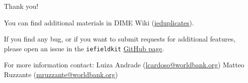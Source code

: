 \documentclass[aspectratio=169]{beamer}
\begin{document}
\begin{frame}{Thank you!}
    
    You can find additional materials in DIME Wiki (\textcolor{blue}{\hyperlink{https://dimewiki.worldbank.org/wiki/Ieduplicates}{ieduplicates}}).
    
    \vspace{0.75em}
    
    If you find any bug, or if you want to submit requests for additional features, please open an issue in the \texttt{iefieldkit} \textcolor{blue}{\hyperlink{https://github.com/worldbank/iefieldkit}{GitHub page}}.
    
    \vspace{1.25em}
    For more information contact:
    \newline Luiza Andrade (\url{lcardoso@worldbank.org})
    \newline Matteo Ruzzante (\url{mruzzante@worldbank.org}) 

\end{frame}
\end{document}
